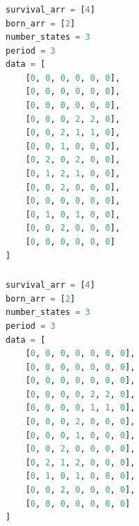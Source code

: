 \documentclass[12pt]{article}
\numberwithin{figure}{section} %
\begin{document}
\noindent\begin{minipage}{.45\textwidth}
\subsubsection{}
\begin{lstlisting}[language = Python]
survival_arr = [4]
born_arr = [2]
number_states = 3
period = 3
data = [
    [0, 0, 0, 0, 0, 0],
    [0, 0, 0, 0, 0, 0],
    [0, 0, 0, 0, 0, 0],
    [0, 0, 0, 2, 2, 0],
    [0, 0, 2, 1, 1, 0],
    [0, 0, 1, 0, 0, 0],
    [0, 2, 0, 2, 0, 0],
    [0, 1, 2, 1, 0, 0],
    [0, 0, 2, 0, 0, 0],
    [0, 0, 0, 0, 0, 0],
    [0, 1, 0, 1, 0, 0],
    [0, 0, 2, 0, 0, 0],
    [0, 0, 0, 0, 0, 0]
]
\end{lstlisting}
\end{minipage}\hfill
\begin{minipage}{.45\textwidth}
\subsubsection{}
\begin{lstlisting}[language = Python]
survival_arr = [4]
born_arr = [2]
number_states = 3
period = 3
data = [
    [0, 0, 0, 0, 0, 0, 0],
    [0, 0, 0, 0, 0, 0, 0],
    [0, 0, 0, 0, 0, 0, 0],
    [0, 0, 0, 0, 2, 2, 0],
    [0, 0, 0, 0, 1, 1, 0],
    [0, 0, 0, 2, 0, 0, 0],
    [0, 0, 0, 1, 0, 0, 0],
    [0, 0, 2, 0, 0, 0, 0],
    [0, 2, 1, 2, 0, 0, 0],
    [0, 1, 0, 1, 0, 0, 0],
    [0, 0, 2, 0, 0, 0, 0],
    [0, 0, 0, 0, 0, 0, 0]
]

\end{lstlisting}
\end{minipage}
\end{document}
